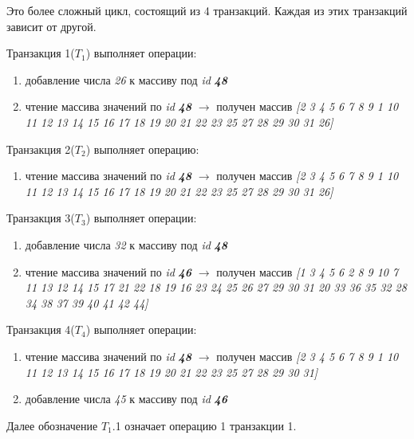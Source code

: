 \documentclass[12pt,  openany]{book}
\begin{document}
Это более сложный цикл, состоящий из 4 транзакций.  Каждая из этих транзакций зависит от другой.  \par

Транзакция 1(\textbf{$T_1$}) выполняет операции:
\begin{enumerate}
\item добавление числа \textit{26} к массиву под \textit{id} \textit{\textbf{48}}
\item чтение массива значений по \textit{id} \textit{\textbf{48}} $\rightarrow$ получен массив \textit{[2 3 4 5 6 7 8 9 1 10 11 12 13 14 15 16 17 18 19 20 21 22 23 25 27 28 29 30 31 26]}
\end{enumerate}

\par Транзакция 2(\textbf{$T_2$}) выполняет операцию:
\begin{enumerate}
\item чтение массива значений по \textit{id} \textit{\textbf{48}} $\rightarrow$ получен массив \textit{[2 3 4 5 6 7 8 9 1 10 11 12 13 14 15 16 17 18 19 20 21 22 23 25 27 28 29 30 31 26]}
\end{enumerate}

\par Транзакция 3(\textbf{$T_3$}) выполняет операции:
\begin{enumerate}
\item добавление числа \textit{32} к массиву под \textit{id} \textit{\textbf{48}}
\item чтение массива значений по \textit{id} \textit{\textbf{46}} $\rightarrow$ получен массив \textit{[1 3 4 5 6 2 8 9 10 7 11 13 12 14 15 17 21 22 18 19 16 23 24 25 26 27 29 30 31 20 33 36 35 32 28 34 38 37 39 40 41 42 44]}
\end{enumerate}

\par Транзакция 4(\textbf{$T_4$}) выполняет операции:
\begin{enumerate}
\item чтение массива значений по \textit{id} \textit{\textbf{48}} $\rightarrow$ получен массив \textit{[2 3 4 5 6 7 8 9 1 10 11 12 13 14 15 16 17 18 19 20 21 22 23 25 27 28 29 30 31]}
\item добавление числа \textit{45} к массиву под \textit{id} \textit{\textbf{46}}
\end{enumerate}

Далее обозначение \textbf{$T_1$}.1 означает операцию 1 транзакции 1.  
\end{document}
